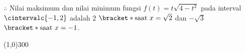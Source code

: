 \begin{enumerate}[leftmargin=*, label={\arabic*}.]
$\therefore$ Nilai maksimum dan nilai minimum fungsi $f(t)=t\sqrt{4-t^2}$ pada 
interval $\cintervalc{-1,2}$ adalah $2$ $\bracket*{\text{saat $x = \sqrt{2}$}}$ 
dan $-\sqrt{3}$ $\bracket*{\text{saat $x = -1$}}$.
\end{enumerate}
\begin{center}
    \line(1,0){300}
\end{center}